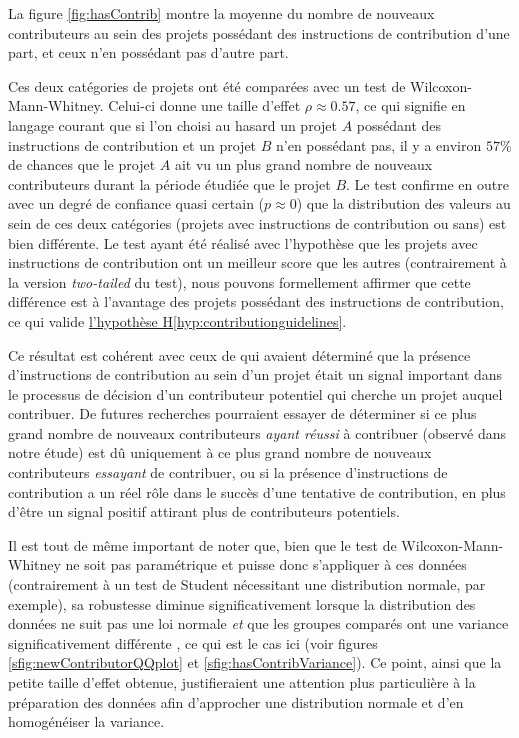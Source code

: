 \documentclass[dvipsnames]{llncs}
\newcommand{\en}[1]{\foreignlanguage{english}{\emph{#1}}}
\begin{document}
    La figure \ref{fig:hasContrib} montre la moyenne du nombre de nouveaux contributeurs au sein des projets
    possédant des instructions de contribution d'une part, et ceux n'en possédant pas d'autre part.

    Ces deux catégories de projets ont été comparées avec un test de Wilcoxon-Mann-Whitney. Celui-ci donne une
    taille d'effet $ρ \approx 0.57$, ce qui signifie en langage courant que si l'on choisi au hasard un projet
    $A$ possédant des instructions de contribution et un projet $B$ n'en possédant pas, il y a environ $57\%$
    de chances que le projet $A$ ait vu un plus grand nombre de nouveaux contributeurs durant la période
    étudiée que le projet $B$. Le test confirme en outre avec un degré de confiance quasi certain ($p \approx
    0$) que la distribution des valeurs au sein de ces deux catégories (projets avec instructions de
    contribution ou sans) est bien différente. Le test ayant été réalisé avec l'hypothèse que les projets avec
    instructions de contribution ont un meilleur score que les autres (contrairement à la version
    \en{two-tailed} du test), nous pouvons formellement affirmer que cette différence est à l'avantage des
    projets possédant des instructions de contribution, ce qui valide
    \hyperref[hyp:contributionguidelines]{l'hypothèse H\ref*{hyp:contributionguidelines}}.

    Ce résultat est cohérent avec ceux de \textcite[p.~11]{signals-2019} qui avaient déterminé que la présence
    d'instructions de contribution au sein d'un projet était un signal important dans le processus de décision
    d'un contributeur potentiel qui cherche un projet auquel contribuer. De futures recherches pourraient
    essayer de déterminer si ce plus grand nombre de nouveaux contributeurs \emph{ayant réussi} à contribuer
    (observé dans notre étude) est dû uniquement à ce plus grand nombre de nouveaux contributeurs
    \emph{essayant} de contribuer, ou si la présence d'instructions de contribution a un réel rôle dans le
    succès d'une tentative de contribution, en plus d'être un signal positif attirant plus de contributeurs
    potentiels.

    Il est tout de même important de noter que, bien que le test de Wilcoxon-Mann-Whitney ne soit pas
    paramétrique et puisse donc s'appliquer à ces données (contrairement à un test de Student nécessitant une
    distribution normale, par exemple), sa robustesse diminue significativement lorsque la distribution des
    données ne suit pas une loi normale \emph{et} que les groupes comparés ont une variance significativement
    différente \parencite{WMW-robustness-1998}, ce qui est le cas ici (voir figures
    \ref{sfig:newContributorQQplot} et \ref{sfig:hasContribVariance}). Ce point, ainsi que la petite taille
    d'effet obtenue, justifieraient une attention plus particulière à la préparation des données afin
    d'approcher une distribution normale et d'en homogénéiser la variance.
\end{document}
